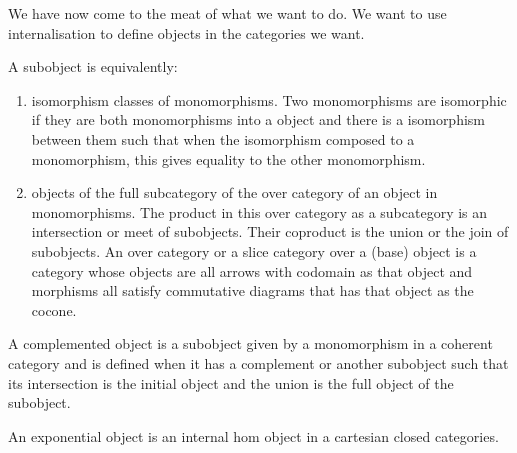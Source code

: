 We have now come to the meat of what we want to do.
We want to use internalisation to define objects in the categories we want.

\begin{definition}[Subobject]
    \label{definition-subobject}
    A subobject is equivalently:
    \begin{enumerate}
        \item isomorphism classes of monomorphisms. Two monomorphisms are isomorphic if they are both monomorphisms into a object and there is a isomorphism between them such that when the isomorphism composed to a monomorphism, this gives equality to the other monomorphism.
        \item objects of the full subcategory of the over category of an object in monomorphisms. 
		The product in this over category as a subcategory is an intersection or meet of subobjects.
		Their coproduct is the union or the join of subobjects. 
		An over category or a slice category over a (base) object is a category whose objects are all arrows with codomain as that object and morphisms all satisfy commutative diagrams that has that object as the cocone.
    \end{enumerate}
\end{definition}

\begin{definition}
    \label{definition-complemented-object}
    A complemented object is a subobject given by a monomorphism in a coherent category and is defined when it has a complement or another subobject such that its intersection is the initial object and the union is the full object of the subobject.
\end{definition}

\begin{definition}
    \label{definition-exponential-object}
    An exponential object is an internal hom object in a cartesian closed categories.
\end{definition}


